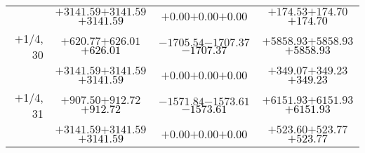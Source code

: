 \documentclass[compress]{beamer}
\begin{document}
\begin{frame}
{\begin{tabular}{r | c | c | c}
           & $+3141.59$\hspace{0.1 cm}$+3141.59$\hspace{0.1 cm}\textcolor{black}{$+3141.59$} & $+0.00$\hspace{0.1 cm}$+0.00$\hspace{0.1 cm}\textcolor{black}{$+0.00$} & $+174.53$\hspace{0.1 cm}$+174.70$\hspace{0.1 cm}\textcolor{black}{$+174.70$} \\
$+$1/4, 30 & $+620.77$\hspace{0.1 cm}$+626.01$\hspace{0.1 cm}\textcolor{black}{$+626.01$} & $-1705.54$\hspace{0.1 cm}$-1707.37$\hspace{0.1 cm}\textcolor{black}{$-1707.37$} & $+5858.93$\hspace{0.1 cm}$+5858.93$\hspace{0.1 cm}\textcolor{black}{$+5858.93$} \\
           & $+3141.59$\hspace{0.1 cm}$+3141.59$\hspace{0.1 cm}\textcolor{black}{$+3141.59$} & $+0.00$\hspace{0.1 cm}$+0.00$\hspace{0.1 cm}\textcolor{black}{$+0.00$} & $+349.07$\hspace{0.1 cm}$+349.23$\hspace{0.1 cm}\textcolor{black}{$+349.23$} \\
$+$1/4, 31 & $+907.50$\hspace{0.1 cm}$+912.72$\hspace{0.1 cm}\textcolor{black}{$+912.72$} & $-1571.84$\hspace{0.1 cm}$-1573.61$\hspace{0.1 cm}\textcolor{black}{$-1573.61$} & $+6151.93$\hspace{0.1 cm}$+6151.93$\hspace{0.1 cm}\textcolor{black}{$+6151.93$} \\
           & $+3141.59$\hspace{0.1 cm}$+3141.59$\hspace{0.1 cm}\textcolor{black}{$+3141.59$} & $+0.00$\hspace{0.1 cm}$+0.00$\hspace{0.1 cm}\textcolor{black}{$+0.00$} & $+523.60$\hspace{0.1 cm}$+523.77$\hspace{0.1 cm}\textcolor{black}{$+523.77$} \\

\end{tabular}}
\end{frame}
\end{document}
